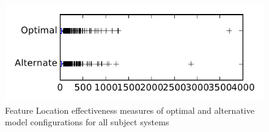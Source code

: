 
\begin{figure}
\centering
\includegraphics[height=0.4\textheight]{figures/combo/flt_rq1_tiny}
\caption{Feature Location effectiveness measures of optimal and alternative model configurations for all subject systems}
\label{fig:combo:flt:rq1:tiny}
\end{figure}
